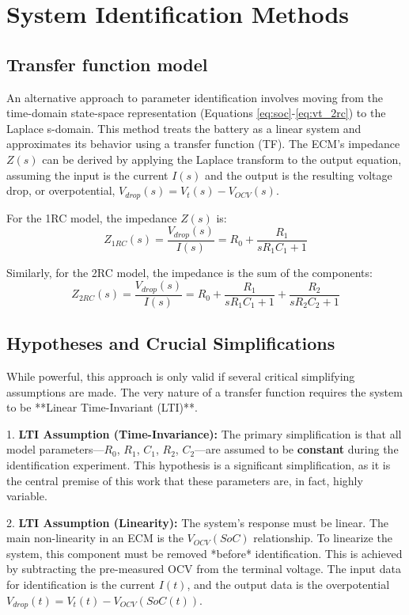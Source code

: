 \documentclass[]{article}
\begin{document}
\section{System Identification Methods}

\subsection{Transfer function model}

An alternative approach to parameter identification involves moving from the time-domain state-space representation (Equations \ref{eq:soc}-\ref{eq:vt_2rc}) to the Laplace s-domain. This method treats the battery as a linear system and approximates its behavior using a transfer function (TF). The ECM's impedance $Z(s)$ can be derived by applying the Laplace transform to the output equation, assuming the input is the current $I(s)$ and the output is the resulting voltage drop, or overpotential, $V_{drop}(s) = V_t(s) - V_{OCV}(s)$.

For the 1RC model, the impedance $Z(s)$ is:
\begin{equation}
	\label{eq:tf_1rc}
	Z_{1RC}(s) = \frac{V_{drop}(s)}{I(s)} = R_0 + \frac{R_1}{sR_1C_1 + 1}
\end{equation}

Similarly, for the 2RC model, the impedance is the sum of the components:
\begin{equation}
	\label{eq:tf_2rc}
	Z_{2RC}(s) = \frac{V_{drop}(s)}{I(s)} = R_0 + \frac{R_1}{sR_1C_1 + 1} + \frac{R_2}{sR_2C_2 + 1}
\end{equation}

\subsection{Hypotheses and Crucial Simplifications}

While powerful, this approach is only valid if several critical simplifying assumptions are made. The very nature of a transfer function requires the system to be **Linear Time-Invariant (LTI)**.

1.  \textbf{LTI Assumption (Time-Invariance):} The primary simplification is that all model parameters—$R_0$, $R_1$, $C_1$, $R_2$, $C_2$—are assumed to be \textbf{constant} during the identification experiment. This hypothesis is a significant simplification, as it is the central premise of this work that these parameters are, in fact, highly variable.

2.  \textbf{LTI Assumption (Linearity):} The system's response must be linear. The main non-linearity in an ECM is the $V_{OCV}(SoC)$ relationship. To linearize the system, this component must be removed *before* identification. This is achieved by subtracting the pre-measured OCV from the terminal voltage. The input data for identification is the current $I(t)$, and the output data is the overpotential $V_{drop}(t) = V_t(t) - V_{OCV}(SoC(t))$.
\end{document}
